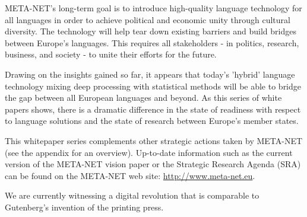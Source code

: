 \documentclass[]{../../metanetpaper}
\begin{document}
\begin{multicols}{2}

META-NET’s long-term goal is to introduce high-quality language
technology for all languages in order to achieve political and
economic unity through cultural diversity. The technology will help
tear down existing barriers and build bridges between Europe’s
languages. This requires all stakeholders - in politics, research,
business, and society - to unite their efforts for the future.

Drawing on the insights gained so far, it appears that today’s
'hybrid' language technology mixing deep processing with statistical
methods will be able to bridge the gap between all European languages
and beyond. As this series of white papers shows, there is a dramatic
difference in the state of readiness with respect to language
solutions and the state of research between Europe’s member states.

This whitepaper series complements other strategic actions taken by
META-NET (see the appendix for an overview). Up-to-date information
such as the current version of the META-NET vision paper \cite{Vision}
or the Strategic Research Agenda (SRA) can be found on the META-NET
web site: \url{http://www.meta-net.eu}.

We are currently witnessing a digital revolution that is comparable to
Gutenberg’s invention of the printing press.


\end{multicols}
\clearpage
{}
\end{document}
